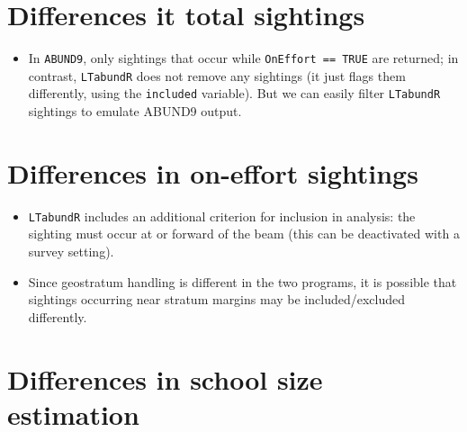\documentclass[
]{book}
\providecommand{\tightlist}{%
  \setlength{\itemsep}{0pt}\setlength{\parskip}{0pt}}
\begin{document}
\hypertarget{differences-it-total-sightings}{%
\section*{Differences it total sightings}\label{differences-it-total-sightings}}

\begin{itemize}
\tightlist
\item
  In \texttt{ABUND9}, only sightings that occur while \texttt{OnEffort\ ==\ TRUE} are returned; in contrast, \texttt{LTabundR} does not remove any sightings (it just flags them differently, using the \texttt{included} variable). But we can easily filter \texttt{LTabundR} sightings to emulate ABUND9 output.
\end{itemize}

\hypertarget{differences-in-on-effort-sightings}{%
\section*{Differences in on-effort sightings}\label{differences-in-on-effort-sightings}}

\begin{itemize}
\item
  \texttt{LTabundR} includes an additional criterion for inclusion in analysis: the sighting must occur at or forward of the beam (this can be deactivated with a survey setting).
\item
  Since geostratum handling is different in the two programs, it is possible that sightings occurring near stratum margins may be included/excluded differently.
\end{itemize}

\hypertarget{differences-in-school-size-estimation}{%
\section*{Differences in school size estimation}\label{differences-in-school-size-estimation}}
\end{document}
